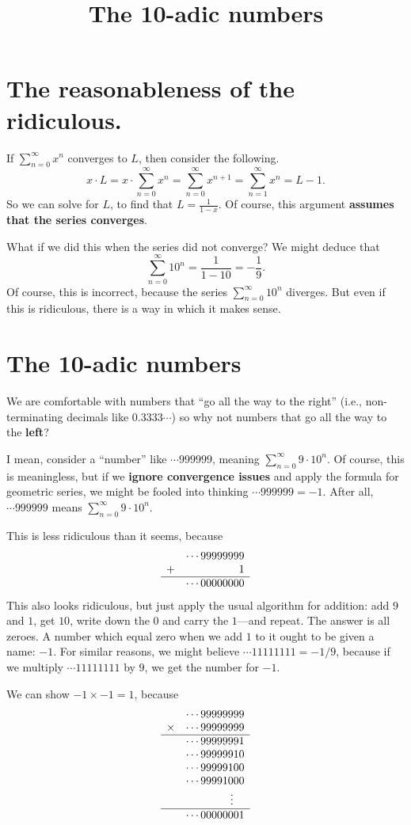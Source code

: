 \documentclass[11pt]{article}
\title{The 10-adic numbers}
\begin{document}
\section*{The reasonableness of the ridiculous.}

If $\sum_{n=0}^\infty x^n$ converges to $L$, then consider the following.
$$
x \cdot L = x \cdot \sum_{n=0}^\infty x^n = \sum_{n=0}^\infty x^{n+1} = \sum_{n=1}^\infty x^n = L - 1.
$$
So we can solve for $L$, to find that $L = \displaystyle\frac{1}{1 -
  x}$.  Of course, this argument \textbf{assumes that the series
  converges}.

What if we did this when the series did not converge?  We might deduce that
$$
\sum_{n=0}^\infty 10^n = \frac{1}{1 - 10} = - \frac{1}{9}.
$$
Of course, this is incorrect, because the series $\sum_{n=0}^\infty
10^n$ diverges.  But even if this is ridiculous, there is a way in
which it makes sense.

\section*{The 10-adic numbers}

We are comfortable with numbers that ``go all the way to the right''
(i.e., non-terminating decimals like $0.3333\cdots$) so why not
numbers that go all the way to the \textbf{left}?

I mean, consider a ``number'' like $\cdots 999999$, meaning
$\sum_{n=0}^\infty 9 \cdot 10^n$.  Of course, this is meaningless, but
if we \textbf{ignore convergence issues} and apply the formula for
geometric series, we might be fooled into thinking $\cdots 999999 =
-1$.  After all, $\cdots 999999$ means $\sum_{n=0}^\infty 9 \cdot 10^n$.

This is less ridiculous than it seems, because
$$
\begin{array}{cr}
  & \cdots 99999999 \\
+ & 1 \\
\hline
 & \cdots  00000000
\end{array}
$$
This also looks ridiculous, but just apply the usual algorithm for
addition: add $9$ and $1$, get $10$, write down the $0$ and carry the
$1$---and repeat.  The answer is all zeroes.  A number which equal
zero when we add $1$ to it ought to be given a name: $-1$.  For
similar reasons, we might believe $\cdots 11111111 = -1/9$, because if
we multiply $\cdots 11111111$ by $9$, we get the number for $-1$.

We can show $-1 \times -1 = 1$, because
$$
\begin{array}{cr}
       & \cdots 99999999 \\
\times & \cdots 99999999 \\
\hline
 & \cdots 99999991 \\
 & \cdots 99999910 \\
 & \cdots 99999100 \\
 & \cdots 99991000 \\
 & \vdots \hspace{1em} \\
\hline
 & \cdots 00000001
\end{array}
$$
\end{document}
